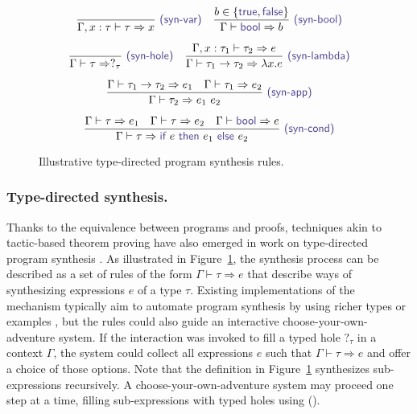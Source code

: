 \documentclass[nonacm,anonymous,sigplan,screen]{acmart}
\newcommand{\ident}[1]{\textsf{\color{DarkSlateBlue}{#1}}}
\begin{document}
\begin{figure}
\[
\begin{array}{c}
\dfrac{}{\Gamma,x:\tau \vdash \tau \Rightarrow x}~\ident{(syn-var)} \quad
\dfrac{b\in \{\ident{true},\ident{false}\} }{\Gamma \vdash \ident{bool} \Rightarrow b}~\ident{(syn-bool)} \\[1.5em]
\dfrac{}{\Gamma \vdash \tau \Rightarrow ?_\tau}~\ident{(syn-hole)}\quad
\dfrac{\Gamma,x:\tau_1\vdash \tau_2 \Rightarrow e}{\Gamma \vdash \tau_1 \rightarrow \tau_2 \Rightarrow \lambda x.e}~\ident{(syn-lambda)}\\[1.5em]
\dfrac{\Gamma \vdash \tau_1\rightarrow\tau_2 \Rightarrow e_1 \quad \Gamma \vdash \tau_1 \Rightarrow e_2}{\Gamma \vdash \tau_2 \Rightarrow e_1~e_2}~\ident{(syn-app)}\\[1.5em]
\dfrac{\Gamma \vdash \tau \Rightarrow e_1 \quad \Gamma \vdash \tau \Rightarrow e_2 \quad \Gamma \vdash \ident{bool} \Rightarrow e}{\Gamma \vdash \tau \Rightarrow \ident{if}~e~\ident{then}~e_1~\ident{else}~e_2}~\ident{(syn-cond)}
\end{array}
\]
\caption{Illustrative type-directed program synthesis rules.}
\label{fig:synths}
\end{figure}

\subsubsection*{Type-directed synthesis.}
Thanks to the equivalence between programs and proofs, techniques akin to tactic-based theorem
proving have also emerged in work on type-directed program synthesis \cite{knoth-2023-synthesis}.
As illustrated in Figure~\ref{fig:synths}, the synthesis process can be described as a set of
rules of the form $\Gamma \vdash \tau \Rightarrow e$ that describe ways of synthesizing
expressions $e$ of a type $\tau$. Existing implementations of the mechanism typically aim to
automate program synthesis by using richer types or examples
\cite{polikarpova-2016-synthesis,hughes-2024-synthesis,osera-2015-synthesis}, but the rules
could also guide an interactive choose-your-own-adventure system. If the interaction was invoked to fill a
typed hole $?_\tau$ in a context $\Gamma$, the system could collect all expressions $e$ such that
$\Gamma \vdash \tau \Rightarrow e$ and offer a choice of those options. Note that the definition
in Figure~\ref{fig:synths} synthesizes sub-expressions recursively. A choose-your-own-adventure
system may proceed one step at a time, filling sub-expressions with typed holes using (\ident{syn-hole}).
\end{document}
